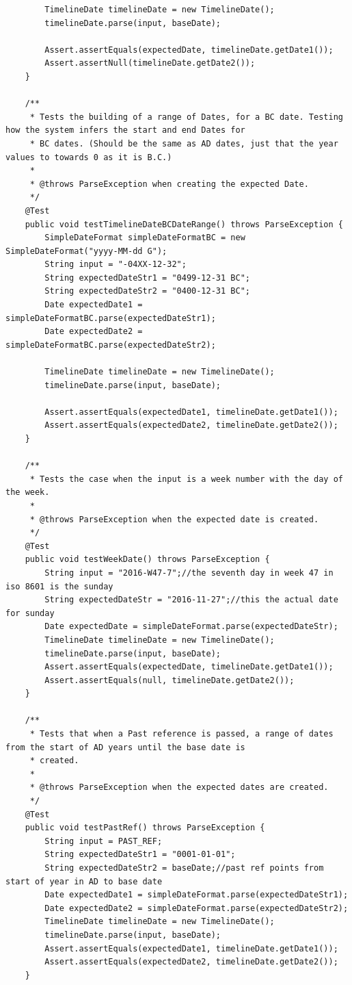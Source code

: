 \begin{lstlisting}
        TimelineDate timelineDate = new TimelineDate();
        timelineDate.parse(input, baseDate);

        Assert.assertEquals(expectedDate, timelineDate.getDate1());
        Assert.assertNull(timelineDate.getDate2());
    }

    /**
     * Tests the building of a range of Dates, for a BC date. Testing how the system infers the start and end Dates for
     * BC dates. (Should be the same as AD dates, just that the year values to towards 0 as it is B.C.)
     *
     * @throws ParseException when creating the expected Date.
     */
    @Test
    public void testTimelineDateBCDateRange() throws ParseException {
        SimpleDateFormat simpleDateFormatBC = new SimpleDateFormat("yyyy-MM-dd G");
        String input = "-04XX-12-32";
        String expectedDateStr1 = "0499-12-31 BC";
        String expectedDateStr2 = "0400-12-31 BC";
        Date expectedDate1 = simpleDateFormatBC.parse(expectedDateStr1);
        Date expectedDate2 = simpleDateFormatBC.parse(expectedDateStr2);

        TimelineDate timelineDate = new TimelineDate();
        timelineDate.parse(input, baseDate);

        Assert.assertEquals(expectedDate1, timelineDate.getDate1());
        Assert.assertEquals(expectedDate2, timelineDate.getDate2());
    }

    /**
     * Tests the case when the input is a week number with the day of the week.
     *
     * @throws ParseException when the expected date is created.
     */
    @Test
    public void testWeekDate() throws ParseException {
        String input = "2016-W47-7";//the seventh day in week 47 in iso 8601 is the sunday
        String expectedDateStr = "2016-11-27";//this the actual date for sunday
        Date expectedDate = simpleDateFormat.parse(expectedDateStr);
        TimelineDate timelineDate = new TimelineDate();
        timelineDate.parse(input, baseDate);
        Assert.assertEquals(expectedDate, timelineDate.getDate1());
        Assert.assertEquals(null, timelineDate.getDate2());
    }

    /**
     * Tests that when a Past reference is passed, a range of dates from the start of AD years until the base date is
     * created.
     *
     * @throws ParseException when the expected dates are created.
     */
    @Test
    public void testPastRef() throws ParseException {
        String input = PAST_REF;
        String expectedDateStr1 = "0001-01-01";
        String expectedDateStr2 = baseDate;//past ref points from start of year in AD to base date
        Date expectedDate1 = simpleDateFormat.parse(expectedDateStr1);
        Date expectedDate2 = simpleDateFormat.parse(expectedDateStr2);
        TimelineDate timelineDate = new TimelineDate();
        timelineDate.parse(input, baseDate);
        Assert.assertEquals(expectedDate1, timelineDate.getDate1());
        Assert.assertEquals(expectedDate2, timelineDate.getDate2());
    }


\end{lstlisting}

